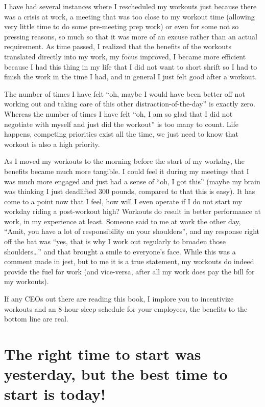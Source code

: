 \documentclass[
  oneside]{book}
\begin{document}
I have had several instances where I rescheduled my workouts just because there was a crisis at work, a meeting that was too close to my workout time (allowing very little time to do some pre-meeting prep work) or even for some not so pressing reasons, so much so that it was more of an excuse rather than an actual requirement. As time passed, I realized that the benefits of the workouts translated directly into my work, my focus improved, I became more efficient because I had this thing in my life that I did not want to short shrift so I had to finish the work in the time I had, and in general I just felt good after a workout.

The number of times I have felt ``oh, maybe I would have been better off not working out and taking care of this other distraction-of-the-day'' is exactly zero. Whereas the number of times I have felt ``oh, I am so glad that I did not negotiate with myself and just did the workout'' is too many to count. Life happens, competing priorities exist all the time, we just need to know that workout is also a high priority.

As I moved my workouts to the morning before the start of my workday, the benefits became much more tangible. I could feel it during my meetings that I was much more engaged and just had a sense of ``oh, I got this'' (maybe my brain was thinking I just deadlifted 300 pounds, compared to that this is easy). It has come to a point now that I feel, how will I even operate if I do not start my workday riding a post-workout high? Workouts do result in better performance at work, in my experience at least. Someone said to me at work the other day, ``Amit, you have a lot of responsibility on your shoulders'', and my response right off the bat was ``yes, that is why I work out regularly to broaden those shoulders\ldots{}'' and that brought a smile to everyone's face. While this was a comment made in jest, but to me it is a true statement, my workouts do indeed provide the fuel for work (and vice-versa, after all my work does pay the bill for my workouts).

If any CEOs out there are reading this book, I implore you to incentivize workouts and an 8-hour sleep schedule for your employees, the benefits to the bottom line are real.

\hypertarget{the-right-time-to-start-was-yesterday-but-the-best-time-to-start-is-today}{%
\section{The right time to start was yesterday, but the best time to start is today!}\label{the-right-time-to-start-was-yesterday-but-the-best-time-to-start-is-today}}
\end{document}
